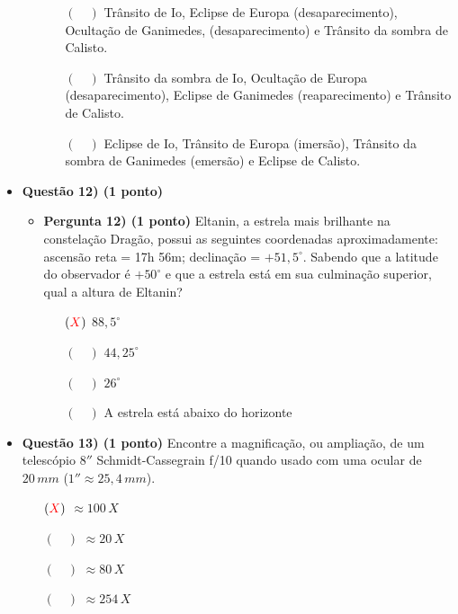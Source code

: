 \documentclass[a4paper, 12pt]{article}
\newcommand{\red}[1]{\textcolor{red}{#1}}
\begin{document}
\begin{flushleft}
\begin{itemize}
\begin{itemize}
\begin{itemize}
                            \item[$(\quad)$] Trânsito de Io, Eclipse de Europa (desaparecimento), Ocultação de Ganimedes, (desaparecimento) e Trânsito da sombra de Calisto.
                            \item[$(\quad)$] Trânsito da sombra de Io, Ocultação de Europa (desaparecimento), Eclipse de Ganimedes (reaparecimento) e Trânsito de Calisto.
                            \item[$(\quad)$] Eclipse de Io, Trânsito de Europa (imersão), Trânsito da sombra de Ganimedes (emersão) e Eclipse de Calisto.
                        \end{itemize}
                \end{itemize}

            \item \textbf{Questão 12) (1 ponto)}
                \begin{itemize}
                    \item \textbf{Pergunta 12) (1 ponto)} Eltanin, a estrela mais brilhante na constelação Dragão, possui as seguintes coordenadas aproximadamente: ascensão reta = 17h 56m; declinação = $+51,5^{\circ}$. Sabendo que a latitude do observador é $+50^{\circ}$ e que a estrela está em sua culminação superior, qual a altura de Eltanin?
                        \begin{itemize}
                            \item[$(\red{X})$] $88,5^{\circ}$
                            \item[$(\quad)$] $44,25^{\circ}$
                            \item[$(\quad)$] $26^{\circ}$
                            \item[$(\quad)$] A estrela está abaixo do horizonte
                        \end{itemize}
                \end{itemize}
            
            \item \textbf{Questão 13) (1 ponto)} Encontre a magnificação, ou ampliação, de um telescópio $8''$ Schmidt-Cassegrain f/10 quando usado com uma ocular de $20 \, mm$ ($1'' \approx 25,4 \, mm$).
                \begin{itemize}
                    \item[$(\red{X})$] $\approx 100 \, X$
                    \item[$(\quad)$] $\approx 20 \, X$
                    \item[$(\quad)$] $\approx 80 \, X$
                    \item[$(\quad)$] $\approx 254 \, X$
                \end{itemize}
            

\end{itemize}
\end{flushleft}
\end{document}

